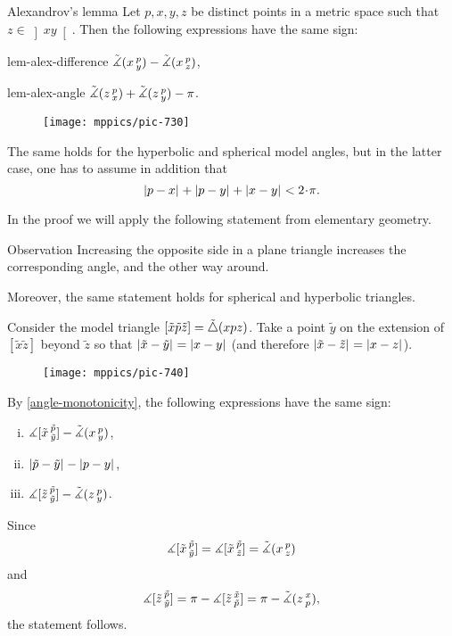 \begin{thm}{Alexandrov's lemma}
\label{lem:alex}  
Let $p,x,y,z$ be distinct points in a metric space such that $z\in \left]x y\right[$.
Then 
the following expressions have the same sign:

\begin{subthm}{lem-alex-difference}
$\tilde\measuredangle(x\,{}^{p}_{y})
-\tilde\measuredangle(x\,{}^{p}_{z})$,
\end{subthm} 

\begin{subthm}{lem-alex-angle}
$\tilde\measuredangle(z\,{}^{p}_{x})
+\tilde\measuredangle(z\,{}^{p}_{y}) -\pi$.
\end{subthm}

\begin{wrapfigure}{r}{25mm}
\vskip-6mm
\centering
\texttt{[image: mppics/pic-730]}
\end{wrapfigure}

The same holds for the hyperbolic and spherical model angles, 
but in the latter case, one has to assume in addition that
\[\dist{p}{x}{}+\dist{p}{y}{}+\dist{x}{y}{}< 2\cdot\pi.\]

\end{thm}

In the proof we will apply the following statement from elementary geometry.

\begin{thm}{Observation}\label{angle-monotonicity}
Increasing the opposite side in a plane triangle increases the corresponding angle, and the other way around.

Moreover, the same statement holds for spherical and hyperbolic triangles.
\end{thm}


Consider the model triangle $[\tilde x\tilde p\tilde z]=\tilde\triangle(x p z)$.
Take 
a point $\tilde y$ on the extension of 
$[\tilde x \tilde z]$ beyond $\tilde z$ so that $|{\tilde x}-{\tilde y}|_{}^{{}}=|{x}-{y}|_{}^{{}}$ (and therefore $|{\tilde x}-{\tilde z}|_{}^{{}}=|{x}-{z}|_{}^{{}}$). 

\begin{wrapfigure}{r}{33mm}
\vskip-0mm
\centering
\texttt{[image: mppics/pic-740]}
\end{wrapfigure}

By \ref{angle-monotonicity},
the following expressions have the same sign:
\begin{enumerate}[(i)]
\item $\measuredangle[\tilde x\,{}^{\tilde p}_{\tilde y}]-\tilde\measuredangle(x\,{}^{p}_{y})$,
\item $|{\tilde p}-{\tilde y}|_{}^{{}}-|{p}-{y}|_{}^{{}}$,
\item $\measuredangle[\tilde z\,{}^{\tilde p}_{\tilde y}]-\tilde\measuredangle(z\,{}^{p}_{y})$.
\end{enumerate}
Since 
\[\measuredangle[\tilde x\,{}^{\tilde p}_{\tilde y}]=\measuredangle[\tilde x\,{}^{\tilde p}_{\tilde z}]=\tilde\measuredangle(x\,{}^{p}_{z})\]
and
\[ \measuredangle[\tilde z\,{}^{\tilde p}_{\tilde y}]
=\pi-\measuredangle[\tilde z\,{}^{\tilde x}_{\tilde p}]
=\pi-\tilde\measuredangle(z\,{}^{x}_{p}),\]
the statement follows.


